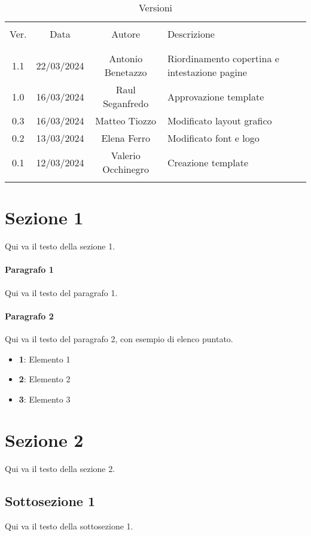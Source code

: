 \documentclass[italian,12pt]{article} %
\begin{document}


\newpage



\begin{table}[!h]
	\caption{Versioni}
	\begin{center}
		\begin{tabular}{ c c c p{9cm} }
			\hline                                                                                 \\[-2ex]
			Ver. & Data       & Autore             & Descrizione                                   \\
			\\[-2ex] \hline \\[-1.5ex]
			1.1  & 22/03/2024 & Antonio Benetazzo  & Riordinamento copertina e intestazione pagine \\
			1.0  & 16/03/2024 & Raul Seganfredo    & Approvazione template                         \\
			0.3  & 16/03/2024 & Matteo Tiozzo      & Modificato layout grafico                     \\
			0.2  & 13/03/2024 & Elena Ferro        & Modificato font e logo                        \\
			0.1  & 12/03/2024 & Valerio Occhinegro & Creazione template                            \\
			\\[-1.5ex] \hline
		\end{tabular}
	\end{center}
\end{table}

\newpage

\tableofcontents

\newpage

\section{Sezione 1}
Qui va il testo della sezione 1.

\paragraph{Paragrafo 1}
Qui va il testo del paragrafo 1.

\paragraph{Paragrafo 2}
Qui va il testo del paragrafo 2, con esempio di elenco puntato.
\begin{itemize}
	\itemsep0em
	\item \textbf{1}: Elemento 1
	\item \textbf{2}: Elemento 2
	\item \textbf{3}: Elemento 3
\end{itemize}



\section{Sezione 2}
Qui va il testo della sezione 2.
\subsection{Sottosezione 1}
Qui va il testo della sottosezione 1.
\end{document}
